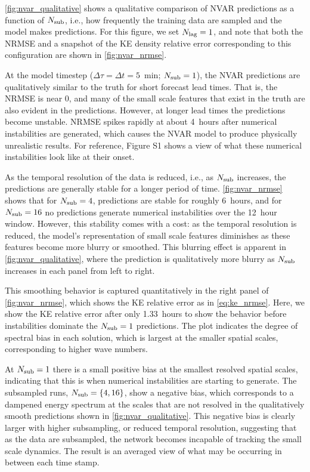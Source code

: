 \documentclass[draft]{agujournal2019}
\begin{document}
\cref{fig:nvar_qualitative} shows a qualitative comparison of NVAR predictions
as a function of $N_\text{sub}$, i.e., how frequently the training data are sampled and
the model makes predictions.
For this figure, we set $N_\text{lag}=1$, and note that both the NRMSE and a snapshot
of the KE density relative error corresponding to this configuration are shown in
\cref{fig:nvar_nrmse}.

At the model timestep ($\Delta \tau = \Delta t = 5$~min; $N_\text{sub}=1$), the NVAR predictions are
qualitatively similar to the truth for short forecast lead times.
That is, the NRMSE is near 0, and
many of the small scale features that exist in the truth are also evident
in the predictions.
However, at longer lead times the predictions become unstable.
NRMSE spikes rapidly at about 4~hours after numerical instabilities are
generated, which causes the NVAR model to produce physically unrealistic results.
For reference, Figure S1 shows a view of what these
numerical instabilities look like at their onset.

As the temporal resolution of the data is reduced, i.e., as $N_\text{sub}$ increases,
the predictions are generally stable for a longer period of time.
\cref{fig:nvar_nrmse} shows that for $N_\text{sub}=4$, predictions are stable for roughly
6~hours, and for $N_\text{sub}=16$ no predictions generate numerical instabilities over the
12~hour window.
However, this stability comes with a cost: as the temporal resolution is
reduced, the model's representation of small scale features diminishes as these
features become more blurry or smoothed. This blurring effect is apparent in \cref{fig:nvar_qualitative}, where the prediction is qualitatively more blurry as $N_\text{sub}$ increases in each panel from left to right.

This smoothing behavior is captured quantitatively in the right panel of
\cref{fig:nvar_nrmse},
which shows the KE relative error as in \cref{eq:ke_nrmse}.
Here, we show the KE relative error after only 1.33~hours to show the behavior
before instabilities dominate the $N_\text{sub}=1$ predictions.
The plot indicates the degree of spectral bias in each solution, which is
largest at the smaller spatial scales, corresponding to higher wave numbers.

At $N_\text{sub}=1$ there is a small positive bias at the smallest resolved spatial
scales, indicating that this is when numerical instabilities are starting to
generate.
The subsampled runs, $N_\text{sub}=\{4,16\}$, show a negative bias, which corresponds
to a dampened energy spectrum at the scales that are not resolved in the
qualitatively smooth predictions shown in \cref{fig:nvar_qualitative}.
This negative bias is clearly larger with higher subsampling, or reduced
temporal resolution, suggesting that as the data are subsampled, the network
becomes incapable of tracking the small scale dynamics.
The result is an averaged view of what may be occurring in
between each time stamp.
\end{document}

